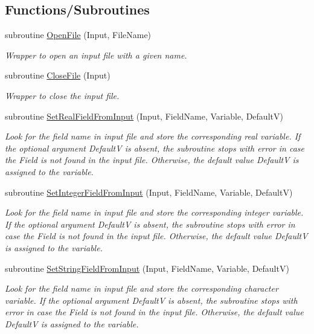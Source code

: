 \subsection*{Functions/Subroutines}
\begin{DoxyCompactItemize}
\item 
subroutine \hyperlink{namespace_input_field_ab4dd5bd42a4fe952b9d298c46d09ac20}{OpenFile} (Input, FileName)
\begin{DoxyCompactList}\small\item\em Wrapper to open an input file with a given name. \item\end{DoxyCompactList}\item 
subroutine \hyperlink{namespace_input_field_a2ff58fb6ffd3fe11782567af59bc26fa}{CloseFile} (Input)
\begin{DoxyCompactList}\small\item\em Wrapper to close the input file. \item\end{DoxyCompactList}\item 
subroutine \hyperlink{namespace_input_field_adc129418985de962f55e62964277411d}{SetRealFieldFromInput} (Input, FieldName, Variable, DefaultV)
\begin{DoxyCompactList}\small\item\em Look for the field name in input file and store the corresponding real variable. If the optional argument DefaultV is absent, the subroutine stops with error in case the Field is not found in the input file. Otherwise, the default value DefaultV is assigned to the variable. \item\end{DoxyCompactList}\item 
subroutine \hyperlink{namespace_input_field_ac3f69e3960e1f451a3e6fe072075f90f}{SetIntegerFieldFromInput} (Input, FieldName, Variable, DefaultV)
\begin{DoxyCompactList}\small\item\em Look for the field name in input file and store the corresponding integer variable. If the optional argument DefaultV is absent, the subroutine stops with error in case the Field is not found in the input file. Otherwise, the default value DefaultV is assigned to the variable. \item\end{DoxyCompactList}\item 
subroutine \hyperlink{namespace_input_field_a6238d310b4f7c163dd317b81bb279393}{SetStringFieldFromInput} (Input, FieldName, Variable, DefaultV)
\begin{DoxyCompactList}\small\item\em Look for the field name in input file and store the corresponding character variable. If the optional argument DefaultV is absent, the subroutine stops with error in case the Field is not found in the input file. Otherwise, the default value DefaultV is assigned to the variable. \item\end{DoxyCompactList}\end{DoxyCompactItemize}
